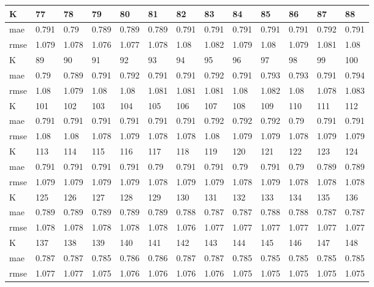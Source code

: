 \begin{appendices}
\begin{center}
\begin{tabularx}{\textwidth}{|l|X|X|X|X|X|X|X|X|X|X|X|X|}
		\hline 
		K & 77 & 78 & 79 & 80 & 81 & 82 & 83 & 84 & 85 & 86 & 87 & 88 \\ \hline 
		mae & 0.791 & 0.79 & 0.789 & 0.789 & 0.789 & 0.791 & 0.791 & 0.791 & 0.791 & 0.791 & 0.792 & 0.791 \\ \hline 
		rmse & 1.079 & 1.078 & 1.076 & 1.077 & 1.078 & 1.08 & 1.082 & 1.079 & 1.08 & 1.079 & 1.081 & 1.08 \\ \hline 
		\hline 
		K & 89 & 90 & 91 & 92 & 93 & 94 & 95 & 96 & 97 & 98 & 99 & 100 \\ \hline 
		mae & 0.79 & 0.789 & 0.791 & 0.792 & 0.791 & 0.791 & 0.792 & 0.791 & 0.793 & 0.793 & 0.791 & 0.794 \\ \hline 
		rmse & 1.08 & 1.079 & 1.08 & 1.08 & 1.081 & 1.081 & 1.081 & 1.08 & 1.082 & 1.08 & 1.078 & 1.083 \\ \hline 
		\hline 
		K & 101 & 102 & 103 & 104 & 105 & 106 & 107 & 108 & 109 & 110 & 111 & 112 \\ \hline 
		mae & 0.791 & 0.791 & 0.791 & 0.791 & 0.791 & 0.791 & 0.792 & 0.792 & 0.792 & 0.79 & 0.791 & 0.791 \\ \hline 
		rmse & 1.08 & 1.08 & 1.078 & 1.079 & 1.078 & 1.078 & 1.08 & 1.079 & 1.079 & 1.078 & 1.079 & 1.079 \\ \hline 
		\hline 
		K & 113 & 114 & 115 & 116 & 117 & 118 & 119 & 120 & 121 & 122 & 123 & 124 \\ \hline 
		mae & 0.791 & 0.791 & 0.791 & 0.791 & 0.79 & 0.791 & 0.791 & 0.79 & 0.791 & 0.79 & 0.789 & 0.789 \\ \hline 
		rmse & 1.079 & 1.079 & 1.079 & 1.079 & 1.078 & 1.079 & 1.079 & 1.078 & 1.079 & 1.078 & 1.078 & 1.078 \\ \hline 
		\hline 
		K & 125 & 126 & 127 & 128 & 129 & 130 & 131 & 132 & 133 & 134 & 135 & 136 \\ \hline 
		mae & 0.789 & 0.789 & 0.789 & 0.789 & 0.789 & 0.788 & 0.787 & 0.787 & 0.788 & 0.788 & 0.787 & 0.787 \\ \hline 
		rmse & 1.078 & 1.078 & 1.078 & 1.078 & 1.078 & 1.076 & 1.077 & 1.077 & 1.077 & 1.077 & 1.077 & 1.077 \\ \hline 
		\hline 
		K & 137 & 138 & 139 & 140 & 141 & 142 & 143 & 144 & 145 & 146 & 147 & 148 \\ \hline 
		mae & 0.787 & 0.787 & 0.785 & 0.786 & 0.786 & 0.787 & 0.787 & 0.785 & 0.785 & 0.785 & 0.785 & 0.785 \\ \hline 
		rmse & 1.077 & 1.077 & 1.075 & 1.076 & 1.076 & 1.076 & 1.076 & 1.075 & 1.075 & 1.075 & 1.075 & 1.075 \\ \hline 
	\end{tabularx} 
\end{center}
\end{appendices}